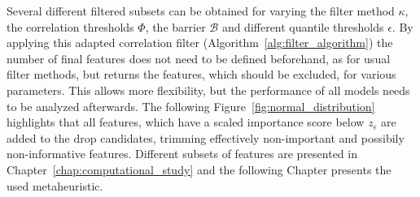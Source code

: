Several different filtered subsets can be obtained for varying the filter method $\kappa$, the correlation thresholds $\Phi$, the barrier $\mathcal{B}$ and
different quantile thresholds $\epsilon$. By applying this adapted correlation filter (Algorithm~\ref{alg:filter_algorithm}) the number of final
features does not need to be defined beforehand, as for usual filter methods, but returns the features, which should be excluded, for
various parameters. This allows more flexibility, but the performance of all models needs to be analyzed afterwards.
The following Figure~\ref{fig:normal_distribution} highlights that all features, which have a scaled importance score below $z_{\epsilon}$ are added to the drop candidates, trimming
effectively non-important and possibily non-informative features. Different subsets of features are presented in Chapter~\ref{chap:computational_study} and the following Chapter
presents the used metaheuristic.

